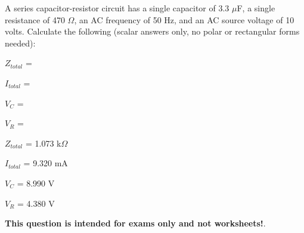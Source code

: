 

A series capacitor-resistor circuit has a single capacitor of 3.3 $\mu$F, a single resistance of 470 $\Omega$, an AC frequency of 50 Hz, and an AC source voltage of 10 volts.  Calculate the following (scalar answers only, no polar or rectangular forms needed):

\vskip 10pt

$Z_{total}$ =

\vskip 10pt

$I_{total}$ = 

\vskip 10pt

$V_{C}$ = 

\vskip 10pt

$V_{R}$ = 







$Z_{total}$ = 1.073 k$\Omega$

\vskip 10pt

$I_{total}$ = 9.320 mA

\vskip 10pt

$V_{C}$ = 8.990 V

\vskip 10pt

$V_{R}$ = 4.380 V







{\bf This question is intended for exams only and not worksheets!}.



